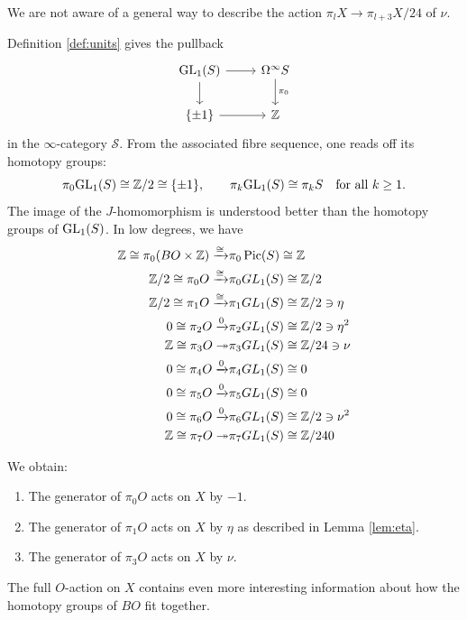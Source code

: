 \documentclass{amsart}
\begin{document}
We are not aware of a general way to describe the action $\pi_l X \to \pi_{l+3} X/24$ of $\nu$.

Definition \ref{def:units} gives the pullback
\[
\begin{tikzcd}
\GL_1(S) \ar[r] \ar[d] & \Omega^\infty S \ar[d, "\pi_0"] \\
\{\pm 1\} \ar[r] & \mathbb{Z}
\end{tikzcd}
\]
in the $\infty$-category $\mathcal{S}$. From the associated fibre sequence, one reads off its homotopy groups:
\[
\pi_0 \mathrm{GL}_1(S) \cong \mathbb{Z}/2 \cong \{\pm 1\}, \qquad
\pi_k \mathrm{GL}_1(S) \cong \pi_k S \quad \text{for all } k \ge 1.
\]
The image of the $J$-homomorphism is understood better than the homotopy groups of $\mathrm{GL}_1(S)$. 
In low degrees, we have \cite{adams1963groups} 
\begin{align*}
\mathbb{Z} \cong \pi_0 (BO \times \mathbb{Z}) \xrightarrow{\cong}& \pi_0 \operatorname{Pic}(S) \cong \mathbb{Z}
\\
    \mathbb{Z}/2 \cong \pi_0 O \xrightarrow{\cong}& \pi_0 GL_1(S) \cong \mathbb{Z}/2
    \\
    \mathbb{Z}/2 \cong \pi_1 O \xrightarrow{\cong}& \pi_1 GL_1(S) \cong \mathbb{Z}/2 \ni \eta
    \\
    0 \cong \pi_2 O \xrightarrow{0}& \pi_2 GL_1(S) \cong \mathbb{Z}/2 \ni \eta^2
    \\
    \mathbb{Z} \cong \pi_3 O \twoheadrightarrow & \pi_3 GL_1(S) \cong \mathbb{Z}/24 \ni \nu
    \\
    0 \cong \pi_4 O \xrightarrow{0}& \pi_4 GL_1(S) \cong 0
    \\
    0 \cong \pi_5 O \xrightarrow{0}& \pi_5 GL_1(S) \cong 0
    \\
    0 \cong \pi_6 O \xrightarrow{0}& \pi_6 GL_1(S) \cong \mathbb{Z}/2 \ni \nu^2
    \\
    \mathbb{Z} \cong \pi_7 O \twoheadrightarrow& \pi_7 GL_1(S) \cong \mathbb{Z}/240
\end{align*}

We obtain:

\begin{proposition}
\label{prop:action-summary}
\begin{enumerate}
    \item[$\natural_1$] The generator of $\pi_0 O$ acts on $X$ by $-1$.
    \item[$\natural_2$] The generator of $\pi_1 O$ acts on $X$ by $\eta$ as described in Lemma \ref{lem:eta}.
    \item[$\natural_3$] The generator of $\pi_3 O$ acts on $X$ by $\nu$.
\end{enumerate}
\end{proposition}
The full $O$-action on $X$ contains even more interesting information about how the homotopy groups of $BO$ fit together.
\end{document}
